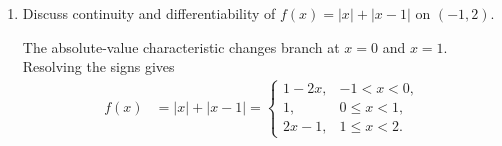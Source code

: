 \begin{enumerate}[label=\thesubsection.\arabic*, ref=\thesubsection.\theenumi]
\[
R_2\rightarrow R_2-2R_3
\]

\[
\myvec{
1&2&3&\big|&0&1&0\\
0&1&0&\big|&-9&6&-2\\
0&0&1&\big|&5&-3&1
}
\]

\[
R_1\rightarrow R_1-3R_3
\]

\[
\myvec{
1&2&0&\big|&-15&10&-3\\
0&1&0&\big|&-9&6&-2\\
0&0&1&\big|&5&-3&1
}
\]

\[
R_1\rightarrow R_1-2R_2
\]

\[
\myvec{
1&0&0&\big|&3&-2&1\\
0&1&0&\big|&-9&6&-2\\
0&0&1&\big|&5&-3&1
}
\]

\[
A^{-1}=
\myvec{
3&-2&1\\
-9&6&-2\\
5&-3&1
}
\]

\[
\begin{aligned}
AA^{-1}
&=
\myvec{
0&1&2\\
1&2&3\\
3&1&0
}
\myvec{
3&-2&1\\
-9&6&-2\\
5&-3&1
}\\[6pt]
&=
\myvec{
1&0&0\\
0&1&0\\
0&0&1
}\\
&=I
\end{aligned}
\]


    The following code verifies the solution.

    \begin{lstlisting}[frame=single, basicstyle=\rmfamily, escapeinside={(*@}{@*)}]
(*@\makebox[\dimexpr\linewidth-2\fboxsep-2\fboxrule\relax][c]{12/codes/Q30.py}@*)
    \end{lstlisting}



    \item
    \label{question:C12-Q48}
    \label{question-short:C12-Q48} Discuss continuity and differentiability of $f(x)=|x|+|x-1|$ on $(-1,2)$.

    \par
    \smallskip
    \solution

    The absolute-value characteristic changes branch at $x=0$ and $x=1$. Resolving the signs gives
    \begin{align*}
        f(x) & =|x|+|x-1|=
        \begin{cases}1-2x,&-1<x<0,\\1,&0\le x<1,\\2x-1,&1\le x<2.
        \end{cases}
    \end{align*}


\end{enumerate}
